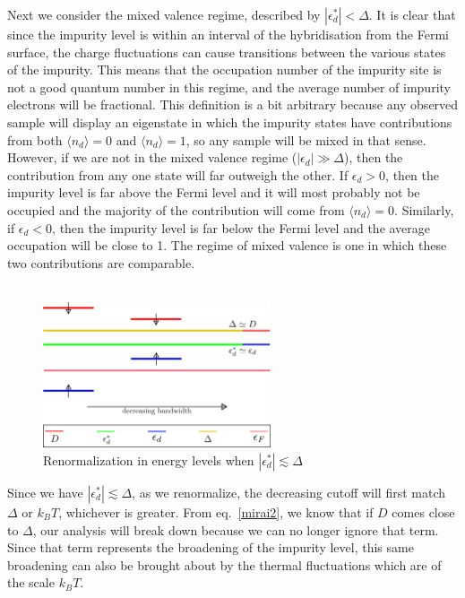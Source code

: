 \documentclass[twoside,11pt]{report}
\numberwithin{equation}{section}
\begin{document}
Next we consider the mixed valence regime, described by \(|\epsilon_d^*| < \Delta\).
It is clear that since the impurity level is within an interval of the hybridisation from the Fermi surface, the charge fluctuations can cause transitions between the various states of the impurity.
This means that the occupation number of the impurity site is not a good quantum number in this regime, and the average number of impurity electrons will be fractional.
This definition is a bit arbitrary because any observed sample will display an eigenstate in which the impurity states have contributions from both \(\langle  n_d\rangle=0\) and \(\langle  n_d\rangle=1\), so any sample will be mixed in that sense.
However, if we are not in the mixed valence regime (\(|\epsilon_d| \gg \Delta\)), then the contribution from any one state will far outweigh the other.
If \(\epsilon_d > 0\), then the impurity level is far above the Fermi level and it will most probably not be occupied and the majority of the contribution will come from \(\langle  n_d\rangle = 0\).
Similarly, if \(\epsilon_d < 0\), then the impurity level is far below the Fermi level and the average occupation will be close to 1.
The regime of mixed valence is one in which these two contributions are comparable.
\\\\
\begin{figure}
	\centering
	\includegraphics[width=0.6\textwidth]{../figures/mixed.png}
	\caption{Renormalization in energy levels when \(|\epsilon_d^*| \lesssim \Delta\)}
\end{figure}
Since we have \(|\epsilon_d^*| \lesssim \Delta\), as we renormalize, the decreasing cutoff will first match \(\Delta\) or \(k_B T\), whichever is greater.
From eq.~\ref{mirai2}, we know that if \(D\) comes close to \(\Delta\), our analysis will break down because we can no longer ignore that term.
Since that term represents the broadening of the impurity level, this same broadening can also be brought about by the thermal fluctuations which are of the scale \(k_B T\).
\end{document}
